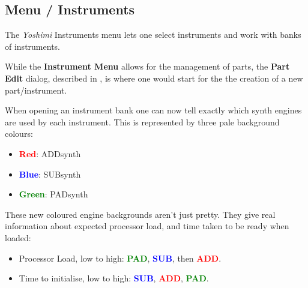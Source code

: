 %
%
%

\subsection{Menu / Instruments}
\label{subsec:menu_instrument}

   The \textsl{Yoshimi} Instruments menu lets one select instruments and work
   with banks of instruments.

   While the \textbf{Instrument Menu} allows for the management of parts, the
   \textbf{Part Edit} dialog, described in
   ,
   is where one would start for the the creation of a new part/instrument.

   When opening an instrument bank one can now tell exactly which synth engines
   are used by each instrument. This is represented by three pale background
   colours:

   \begin{itemize}
      \item \textbf{\textcolor{red}{Red}}: ADDsynth
      \item \textbf{\textcolor{blue}{Blue}}: SUBsynth
      \item \textbf{\textcolor{green}{Green}}: PADsynth
   \end{itemize}

   These new coloured engine backgrounds aren't just pretty. They give real
   information about expected processor load, and time taken to be ready when
   loaded:

   \begin{itemize}
      \item Processor Load, low to high:
         \textbf{\textcolor{green}{PAD}},
         \textbf{\textcolor{blue}{SUB}}, then
         \textbf{\textcolor{red}{ADD}}.
      \item Time to initialise, low to high:
         \textbf{\textcolor{blue}{SUB}},
         \textbf{\textcolor{red}{ADD}},
         \textbf{\textcolor{green}{PAD}}.
   \end{itemize}

